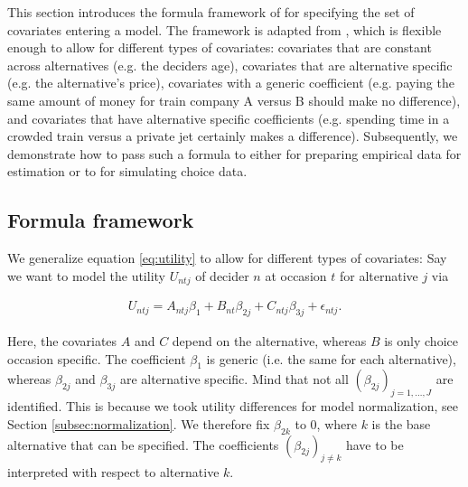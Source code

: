 \documentclass[article]{jss}
\newcommand{\fct}[1]{\code{#1()}}
\begin{document}
This section introduces the formula framework of  for specifying the set of covariates entering a model. The framework is adapted from , which is flexible enough to allow for different types of covariates: covariates that are constant across alternatives (e.g. the deciders age), covariates that are alternative specific (e.g. the alternative's price), covariates with a generic coefficient (e.g. paying the same amount of money for train company A versus B should make no difference), and covariates that have alternative specific coefficients (e.g. spending time in a crowded train versus a private jet certainly makes a difference). Subsequently, we demonstrate how to pass such a formula to either \fct{prepare\_data} for preparing empirical data for estimation or to \fct{simulate\_choices} for simulating choice data.

\subsection{Formula framework} \label{subsec:formula}

We generalize equation \eqref{eq:utility} to allow for different types of covariates: Say we want to model the utility $U_{ntj}$ of decider $n$ at occasion $t$ for alternative $j$ via

\begin{align}
  \label{eq:utility_gen}
  U_{ntj} = A_{ntj} \beta_1 + B_{nt} \beta_{2j} + C_{ntj} \beta_{3j} + \epsilon_{ntj}.
\end{align}

Here, the covariates $A$ and $C$ depend on the alternative, whereas $B$ is only choice occasion specific. The coefficient $\beta_1$ is generic (i.e. the same for each alternative), whereas $\beta_{2j}$ and $\beta_{3j}$ are alternative specific. Mind that not all $(\beta_{2j})_{j=1,\dots,J}$ are identified. This is because we took utility differences for model normalization, see Section \ref{subsec:normalization}. We therefore fix $\beta_{2k}$ to 0, where $k$ is the base alternative that can be specified. The coefficients $(\beta_{2j})_{j\neq k}$ have to be interpreted with respect to alternative $k$.
\end{document}

